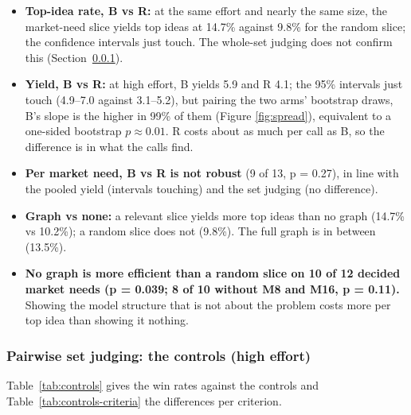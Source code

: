 \begin{itemize}
\tightlist
\item
  \textbf{Top-idea rate, B vs R:} at the same effort and nearly the same size, the market-need slice yields top ideas at 14.7\% against 9.8\% for the random slice; the confidence intervals just touch. The whole-set judging does not confirm this (Section~\ref{pairwise-set-judging-the-controls-high-effort}).
\item
  \textbf{Yield, B vs R:} at high effort, B yields 5.9 and R 4.1; the 95\% intervals just touch (4.9--7.0 against 3.1--5.2), but pairing the two arms' bootstrap draws, B's slope is the higher in 99\% of them (Figure \ref{fig:spread}), equivalent to a one-sided bootstrap $p \approx 0.01$. R costs about as much per call as B, so the difference is in what the calls find.
\item
  \textbf{Per market need, B vs R is not robust} (9 of 13, p = 0.27), in line with the pooled yield (intervals touching) and the set judging (no difference).
\item
  \textbf{Graph vs none:} a relevant slice yields more top ideas than no graph (14.7\% vs 10.2\%); a random slice does not (9.8\%). The full graph is in between (13.5\%).
\item
  \textbf{No graph is more efficient than a random slice on 10 of 12 decided market needs (p = 0.039; 8 of 10 without M8 and M16, p = 0.11).} Showing the model structure that is not about the problem costs more per top idea than showing it nothing.
\end{itemize}

\hypertarget{pairwise-set-judging-the-controls-high-effort}{%
\subsubsection{Pairwise set judging: the controls (high effort)}\label{pairwise-set-judging-the-controls-high-effort}}

Table~\ref{tab:controls} gives the win rates against the controls and Table~\ref{tab:controls-criteria} the differences per criterion.

